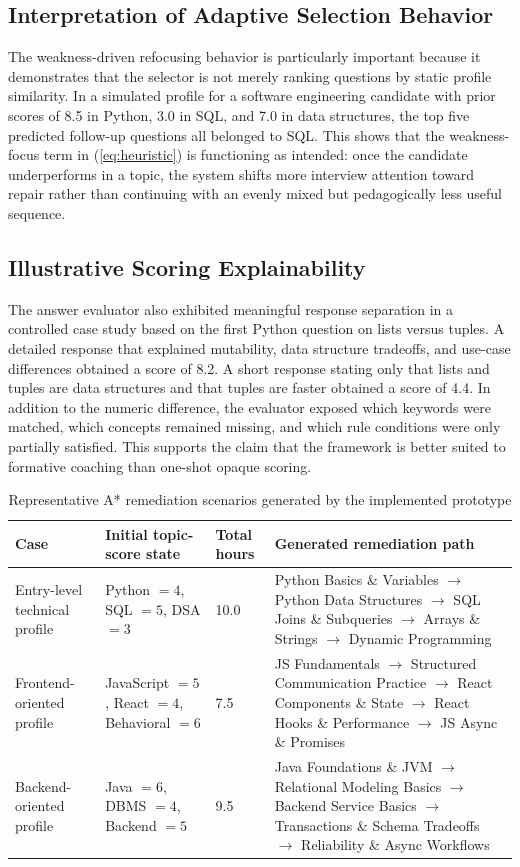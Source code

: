 \documentclass[conference]{IEEEtran}
\begin{document}
\subsection{Interpretation of Adaptive Selection Behavior}
The weakness-driven refocusing behavior is particularly important because it demonstrates that the selector is not merely ranking questions by static profile similarity. In a simulated profile for a software engineering candidate with prior scores of 8.5 in Python, 3.0 in SQL, and 7.0 in data structures, the top five predicted follow-up questions all belonged to SQL. This shows that the weakness-focus term in (\ref{eq:heuristic}) is functioning as intended: once the candidate underperforms in a topic, the system shifts more interview attention toward repair rather than continuing with an evenly mixed but pedagogically less useful sequence.

\subsection{Illustrative Scoring Explainability}
The answer evaluator also exhibited meaningful response separation in a controlled case study based on the first Python question on lists versus tuples. A detailed response that explained mutability, data structure tradeoffs, and use-case differences obtained a score of 8.2. A short response stating only that lists and tuples are data structures and that tuples are faster obtained a score of 4.4. In addition to the numeric difference, the evaluator exposed which keywords were matched, which concepts remained missing, and which rule conditions were only partially satisfied. This supports the claim that the framework is better suited to formative coaching than one-shot opaque scoring.

\begin{table}[t]
\centering
\caption{Representative A* remediation scenarios generated by the implemented prototype}
\label{tab:astar_cases}
\small
\begin{tabular}{L{1.3cm}L{2.8cm}L{1.0cm}L{8.8cm}}
\toprule
\textbf{Case} & \textbf{Initial topic-score state} & \textbf{Total hours} & \textbf{Generated remediation path} \\
\midrule
Entry-level technical profile & Python $=4$, SQL $=5$, DSA $=3$ & 10.0 & Python Basics \& Variables $\rightarrow$ Python Data Structures $\rightarrow$ SQL Joins \& Subqueries $\rightarrow$ Arrays \& Strings $\rightarrow$ Dynamic Programming \\
Frontend-oriented profile & JavaScript $=5$, React $=4$, Behavioral $=6$ & 7.5 & JS Fundamentals $\rightarrow$ Structured Communication Practice $\rightarrow$ React Components \& State $\rightarrow$ React Hooks \& Performance $\rightarrow$ JS Async \& Promises \\
Backend-oriented profile & Java $=6$, DBMS $=4$, Backend $=5$ & 9.5 & Java Foundations \& JVM $\rightarrow$ Relational Modeling Basics $\rightarrow$ Backend Service Basics $\rightarrow$ Transactions \& Schema Tradeoffs $\rightarrow$ Reliability \& Async Workflows \\
\bottomrule
\end{tabular}
\end{table}
\end{document}
